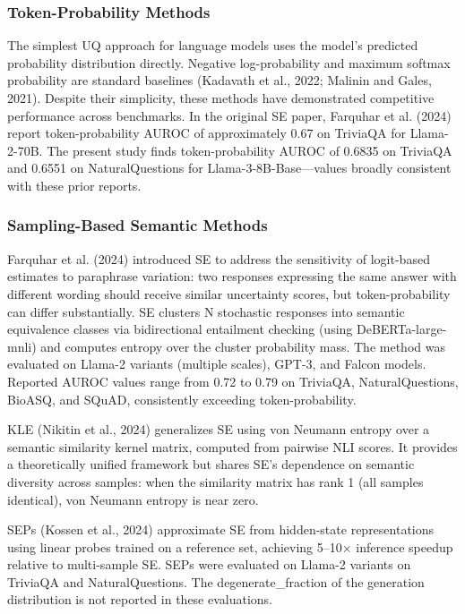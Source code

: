 
\subsubsection{Token-Probability Methods}

The simplest UQ approach for language models uses the model's predicted probability distribution directly. Negative log-probability and maximum softmax probability are standard baselines (Kadavath et al., 2022; Malinin and Gales, 2021). Despite their simplicity, these methods have demonstrated competitive performance across benchmarks. In the original SE paper, Farquhar et al. (2024) report token-probability AUROC of approximately 0.67 on TriviaQA for Llama-2-70B. The present study finds token-probability AUROC of 0.6835 on TriviaQA and 0.6551 on NaturalQuestions for Llama-3-8B-Base—values broadly consistent with these prior reports.

\subsubsection{Sampling-Based Semantic Methods}

Farquhar et al. (2024) introduced SE to address the sensitivity of logit-based estimates to paraphrase variation: two responses expressing the same answer with different wording should receive similar uncertainty scores, but token-probability can differ substantially. SE clusters N stochastic responses into semantic equivalence classes via bidirectional entailment checking (using DeBERTa-large-mnli) and computes entropy over the cluster probability mass. The method was evaluated on Llama-2 variants (multiple scales), GPT-3, and Falcon models. Reported AUROC values range from 0.72 to 0.79 on TriviaQA, NaturalQuestions, BioASQ, and SQuAD, consistently exceeding token-probability.

KLE (Nikitin et al., 2024) generalizes SE using von Neumann entropy over a semantic similarity kernel matrix, computed from pairwise NLI scores. It provides a theoretically unified framework but shares SE's dependence on semantic diversity across samples: when the similarity matrix has rank 1 (all samples identical), von Neumann entropy is near zero.

SEPs (Kossen et al., 2024) approximate SE from hidden-state representations using linear probes trained on a reference set, achieving 5–10× inference speedup relative to multi-sample SE. SEPs were evaluated on Llama-2 variants on TriviaQA and NaturalQuestions. The degenerate_fraction of the generation distribution is not reported in these evaluations.

